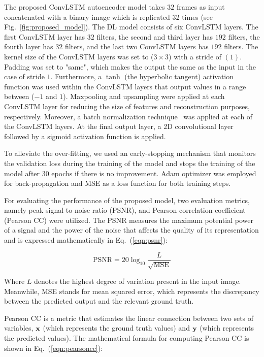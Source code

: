 The proposed ConvLSTM autoencoder model takes \(32\) frames as input concatenated with a binary image which is replicated 32 times (see Fig.~\ref{fig:proposed_model}). 
The DL model consists of six ConvLSTM layers.
The first ConvLSTM layer has \(32\) filters, the second and third layer has \(192\) filters, the fourth layer has \(32\) filters, and the last two ConvLSTM layers has \(192\) filters.
The kernel size of the ConvLSTM layers was set to (\(3\times3\)) with a stride of \((1)\). 
Padding was set to "same", which makes the output the same as the input in the case of stride \(1\).
Furthermore, a \(\tanh\) (the hyperbolic tangent) activation function was used within the ConvLSTM layers that output values in a range between (\(-1\) and \(1\)).
Maxpooling and upsampling were applied at each ConvLSTM layer for reducing the size of features and reconstruction purposes, respectively. 
Moreover, a batch normalization technique~\cite{Santurkar2018} was applied at each of the ConvLSTM layers.
At the final output layer, a 2D convolutional layer followed by a sigmoid activation function is applied.

To alleviate the over-fitting, we used an early-stopping mechanism that monitors the validation loss during the training of the model and stops the training of the model after 30 epochs if there is no improvement. 
Adam optimizer was employed for back-propagation and MSE as a loss function for both training steps.

For evaluating the performance of the proposed model, two evaluation metrics, namely peak signal-to-noise ratio (PSNR), and Pearson correlation coefficient (Pearson CC) were utilized. 
The PSNR measures the maximum potential power of a signal and the power of the noise that affects the quality of its representation and is expressed mathematically in Eq.~(\ref{eqn:psnr}):

\begin{equation}
	\mathrm{PSNR}=20 \log _{10} \frac{L}{\sqrt{\mathrm{MSE}}}
	\label{eqn:psnr}
\end{equation}

Where \(L\) denotes the highest degree of variation present in the input image. 
Meanwhile, MSE stands for mean squared error, which represents the discrepancy between the predicted output and the relevant ground truth.

Pearson CC is a metric that estimates the linear connection between two sets of variables, \(\mathbf{x}\) (which represents the ground truth values) and \(\mathbf{y}\) (which represents the predicted values). 
The mathematical formula for computing Pearson CC is shown in Eq.~(\ref{eqn:pearsoncc}):

